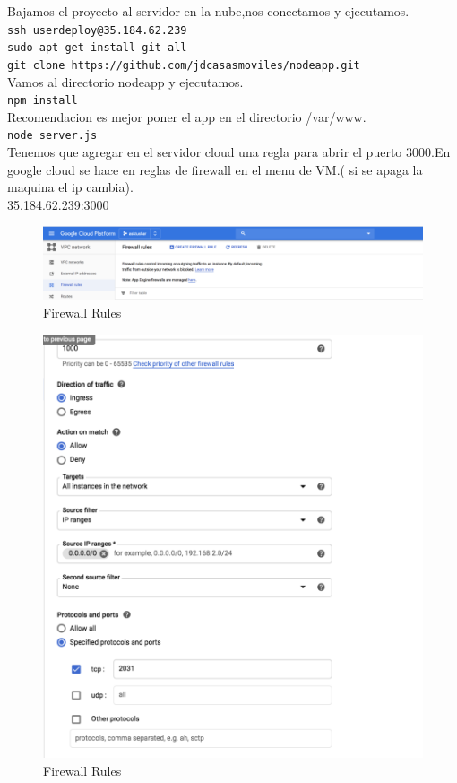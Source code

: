 Bajamos el proyecto al servidor en la nube,nos conectamos y ejecutamos.\\
\texttt{ssh userdeploy@35.184.62.239}\\
\texttt{sudo apt-get install git-all}\\
\texttt{git clone https://github.com/jdcasasmoviles/nodeapp.git}\\
Vamos al directorio nodeapp y ejecutamos.\\
\texttt{npm install}\\
Recomendacion es mejor poner el app en el directorio /var/www.\\
\texttt{node server.js}\\
Tenemos que agregar en el servidor cloud una regla para abrir el puerto 3000.En google cloud
 se hace en reglas de firewall en el menu de VM.( si se apaga la maquina el ip cambia).\\
35.184.62.239:3000\\
\begin{figure}[H] %
	\centering %
	\includegraphics[scale=0.4]{images/c4_7.png}
	\caption{Firewall Rules}
\end{figure}
\begin{figure}[H] %
	\centering %
	\includegraphics[scale=0.3]{images/c4_8.png}
	\caption{Firewall Rules}
\end{figure}
